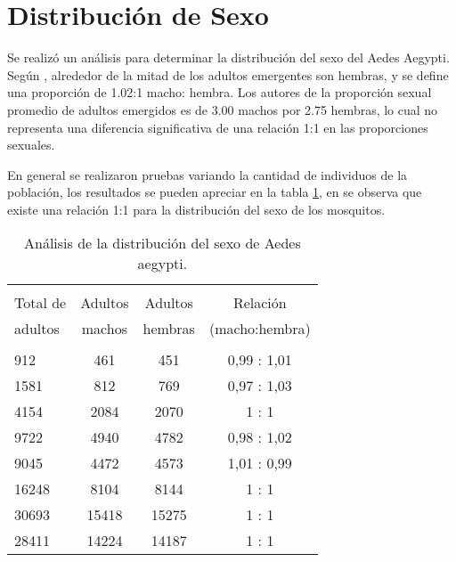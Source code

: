 \section{Distribución de Sexo}
Se realizó un análisis para determinar la distribución del sexo del Aedes Aegypti. Según 
\cite{otero2006stochastic}, alrededor de la mitad de los adultos emergentes son hembras, 
y se define una proporción de 1.02:1 macho: hembra. Los autores de \cite{manrique1998desarrollo} 
la proporción sexual promedio de adultos emergidos es de 3.00 machos por 2.75 hembras, lo cual
no representa una diferencia significativa de una relación 1:1 en las proporciones sexuales. 

En general se realizaron pruebas variando la cantidad de individuos de la población, los resultados se
pueden apreciar en la tabla \ref{tab:distribucion-sexo-test}, en se observa que existe una relación 1:1
para la distribución del sexo de los mosquitos.

\begin{table}
    \begin{center}
        \caption{ \label{tab:distribucion-sexo-test} Análisis de la distribución del sexo de Aedes
        aegypti.}
        \begin{tabular}{p{3cm} c c c }
            \hline \\
            Total de & Adultos & Adultos & Relación \\
            adultos  & machos  & hembras & (macho:hembra) \\
            \hline
            \hline \\
            912    &  461    &  451    &  0,99 : 1,01 \\
            1581   &  812    &  769    &  0,97 : 1,03 \\
            4154   &  2084   &  2070   &  1    : 1 \\
            9722   &  4940   &  4782   &  0,98 : 1,02 \\
            9045   &  4472   &  4573   &  1,01 : 0,99 \\
            16248  &  8104   &  8144   &  1    : 1 \\
            30693  &  15418  &  15275  &  1    : 1 \\
            28411  &  14224  &  14187  &  1    : 1 \\
        \end{tabular}

    \end{center}
\end{table}
